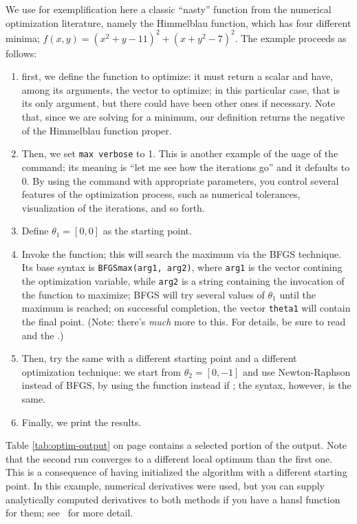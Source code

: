 We use for exemplification here a classic ``nasty'' function from the
numerical optimization literature, namely the Himmelblau function,
which has four different minima; $f(x, y) = (x^2+y-11)^2 +
(x+y^2-7)^2$. The example proceeds as follows:
\begin{enumerate}
\item first, we define the function to optimize: it must return a
  scalar and have, among its arguments, the vector to optimize; in
  this particular case, that is its only argument, but there could
  have been other ones if necessary.  Note that, since we are solving
  for a minimum, our definition returns the negative of the Himmelblau
  function proper.
\item Then, we set \verb|max verbose| to 1. This is another example of
  the uage of the  command; its meaning is ``let me see how
  the iterations go'' and it defaults to 0. By using the 
  command with appropriate parameters, you control several features of
  the optimization process, such as numerical tolerances,
  visualization of the iterations, and so forth.
\item Define $\theta_1 = [0, 0]$ as the starting point.
\item Invoke the  function; this will search the maximum
  via the BFGS technique. Its base syntax is \texttt{BFGSmax(arg1,
    arg2)}, where \texttt{arg1} is the vector contining the
  optimization variable, while \texttt{arg2} is a string containing
  the invocation of the function to maximize; BFGS will try several
  values of $\theta_1$ until the maximum is reached; on successful
  completion, the vector \texttt{theta1} will contain the final
  point. (Note: there's \emph{much} more to this. For details, be sure
  to read \GUG and the \GCR.)
\item Then, try the same with a different starting point and a
  different optimization technique: we start from $\theta_2 = [0, -1]$
  and use Newton-Raphson instead of BFGS, by using the 
  function instead if ; the syntax, however, is the
  same.
\item Finally, we print the results.
\end{enumerate}
Table \ref{tab:optim-output} on page \pageref{tab:optim-output}
contains a selected portion of the output. Note that the second run
converges to a different local optimum than the first one. This is a
consequence of having initialized the algorithm with a different
starting point. In this example, numerical derivatives were used, but
you can supply analytically computed derivatives to both methods if
you have a hansl function for them; see \GUG\ for more detail.

